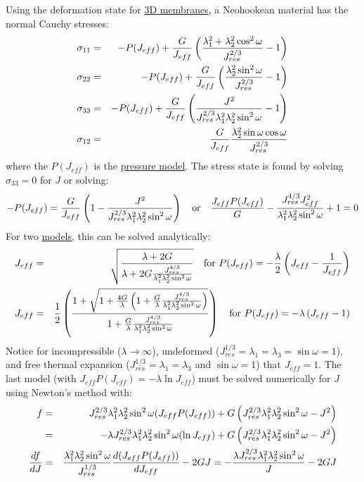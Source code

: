 \documentclass[11pt]{book}
\def\Jeff{J_{eff}}
\def\Jres{J_{res}}
\begin{document}
Using the deformation state for \hyperref[MMT]{3D membranes}, a Neohookean material has the normal Cauchy stresses:
\begin{eqnarray}
      \sigma_{11} & = & -P(\Jeff) + {G\over\Jeff}\left({\lambda_1^2+\lambda_2^2\cos^2\omega\over\Jres^{2/3}}-1\right) \\
      \sigma_{22} & = & -P(\Jeff) + {G\over\Jeff}\left({\lambda_2^2\sin^2\omega\over\Jres^{2/3}}-1\right) \\
      \sigma_{33} & = & -P(\Jeff) + {G\over\Jeff}\left({J^2\over\Jres^{2/3}\lambda_1^2\lambda_2^2\sin^2\omega}-1\right)  \\
      \sigma_{12} & = & {G\over\Jeff}{\lambda_2^2\sin\omega\cos\omega\over \Jres^{2/3}}
\end{eqnarray}
where the $P(\Jeff)$ is the \hyperref[PTerms]{pressure model}. The stress state is found by solving $\sigma_{33}=0$ for $J$ or solving:
\begin{equation}
	-P(\Jeff) =  {G\over\Jeff}\left(1 - {J^2\over\Jres^{2/3}\lambda_1^2\lambda_2^2\sin^2\omega}\right) 
	\quad{\rm or}\quad {\Jeff P(\Jeff)\over  G} - {\Jres^{4/3}\Jeff^2\over\lambda_1^2\lambda_2^2\sin^2\omega} +1 = 0
\end{equation}
For two \hyperref[PTerms]{models}, this can be solved analytically:
\begin{eqnarray}
   \Jeff & = & \sqrt{\lambda+2G\over \lambda + 2G{\Jres^{4/3}\over\lambda_1^2\lambda_2^2\sin^2\omega}}
                                    \quad{\rm for}\ P(\Jeff) = -{\lambda\over2}\left(\Jeff - {1\over\Jeff}\right) \\
   \Jeff & = & {1\over 2}\left({1+\sqrt{1+{4G\over\lambda}\left(1 + {G\over\lambda}{\Jres^{4/3}\over\lambda_1^2\lambda_2^2\sin^2\omega}\right)} 
                           \over 1 + {G\over\lambda}{\Jres^{4/3}\over\lambda_1^2\lambda_2^2\sin^2\omega} } \right)
                                    \quad{\rm for}\ P(\Jeff) = -\lambda\left(\Jeff - 1\right) 
\end{eqnarray}
Notice for incompressible ($\lambda\to\infty$), undeformed ($\Jres^{1/3}=\lambda_1=\lambda_3=\sin\omega =1$), and free thermal expansion ($\Jres^{1/3}=\lambda_1=\lambda_3$ and $\sin\omega=1$) that $\Jeff = 1$.
The last model (with $\Jeff P(\Jeff) = -\lambda \ln \Jeff$) must be solved numerically for $J$ using Newton's method with:
\begin{eqnarray}
	f & = &\Jres^{2/3} \lambda_1^2\lambda_2^2\sin^2\omega(\Jeff P(\Jeff)) +  G\left(\Jres^{2/3}\lambda_1^2\lambda_2^2\sin^2\omega-J^2\right) \\
	       & = & -\lambda\Jres^{2/3} \lambda_1^2\lambda_2^2\sin^2\omega(\ln\Jeff) +  G\left(\Jres^{2/3}\lambda_1^2\lambda_2^2\sin^2\omega-J^2\right)\\
	{df\over dJ} & = & { \lambda_1^2\lambda_2^2\sin^2\omega\over\Jres^{1/3}}{d(\Jeff P(\Jeff))\over d\Jeff} - 2GJ
	           = -{\lambda \Jres^{2/3}\lambda_1^2\lambda_2^2\sin^2\omega\over J} - 2GJ
\end{eqnarray}
\end{document}
